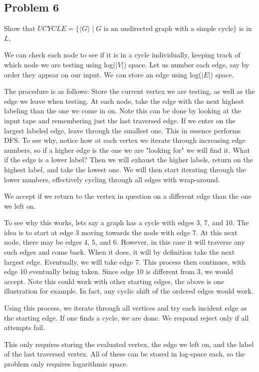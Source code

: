 \documentclass[english]{article}
\begin{document}
\subsection*{Problem 6}
Show that $UCYCLE = \{ \langle G \rangle \mid G \textrm{ is an undirected graph with a simple cycle} \}$
is in $L$.

We can check each node to see if it is in a cycle individually, keeping track of which node we are
testing using log($|V|$) space. Let us number each edge, say by order they appear on our input.
We can store an edge using log($|E|$) space.

The procedure is as follows: Store the current vertex we are testing, as well as the edge we leave
when testing. At each node, take the edge with the next highest labeling than the one we come in on.
Note this can be done by looking at the input tape and remembering just the last traversed edge. If
we enter on the largest labeled edge, leave through the smallest one. This in essence performs DFS.
To see why, notice how at each vertex we iterate through increasing edge numbers, so if a higher edge
is the one we are "looking for" we will find it. What if the edge is a lower label? Then we will exhaust
the higher labels, return on the highest label, and take the lowest one. We will then start iterating
through the lower numbers, effectively cycling through all edges with wrap-around.

We accept if we return to the vertex in question on a different edge than the one we left on.

To see why this works, lets say a graph has a cycle with edges 3, 7, and 10. The idea is to start
at edge 3 moving towards the node with edge 7. At this next node, there may be edges 4, 5, and 6.
However, in this case it will traverse any such edges and come back. When it does, it will by
definition take the next largest edge. Eventually, we will take edge 7. This process then continues,
with edge 10 eventually being taken. Since edge 10 is different from 3, we would accept.
Note this could work with other starting edges, the above is one illustration for example. In fact,
any cyclic shift of the ordered edges would work.

Using this process, we iterate through all vertices and try each incident edge as the starting edge.
If one finds a cycle, we are done. We respond reject only if all attempts fail.

This only requires storing the evaluated vertex, the edge we left on, and the label of the last
traversed vertex. All of these can be stored in log-space each, so the problem only requires
logarithmic space.
\end{document}
